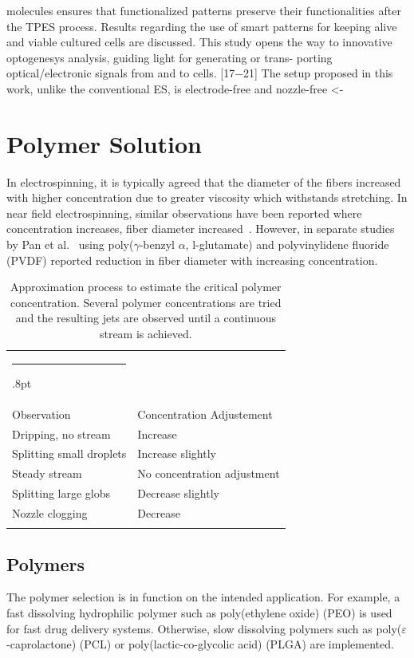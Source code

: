 \documentclass[5p,,preprint,12pt,twocolumn]{elsarticle}
\makeatletter
\def\hlinewd#1{%
  \noalign{\ifnum0=`}\fi\hrule \@height #1%
  \futurelet\reserved@a\@xhline}
\def\tbltoprule{\hlinewd{.8pt}\\[-12pt]}
\def\tblbottomrule{\noalign{\vspace*{6pt}}\hline\noalign{\vspace*{2pt}}}
\def\tblmidrule{\noalign{\vspace*{6pt}}\hline\noalign{\vspace*{2pt}}}
\makeatother
\begin{document}
molecules ensures that functionalized patterns preserve their functionalities after the TPES process. Results regarding the use of smart patterns for keeping alive and viable cultured cells are discussed. This study opens the way to innovative optogenesys analysis, guiding light for generating or trans- porting optical/electronic signals from and to cells. [17\ensuremath{-}21] The setup proposed in this work, unlike the conventional ES, is electrode-free and nozzle-free {\textless}-
    
\section{Polymer Solution}
In electrospinning, it is typically agreed that the diameter of the fibers increased with higher concentration due to greater viscosity which withstands stretching. In near field electrospinning, similar observations have been reported where concentration increases, fiber diameter increased\unskip~\cite{527120:11974306,527120:11974329}. However, in separate studies by Pan et al.\unskip~\cite{527120:11974317,527120:12321129} using poly(\ensuremath{\gamma }-benzyl \ensuremath{\alpha }, l-glutamate) and polyvinylidene fluoride (PVDF) reported reduction in fiber diameter with increasing concentration.
\begin{table}[!htbp]
\caption{{Approximation process to estimate the critical polymer concentration. Several polymer concentrations are tried and the resulting jets are observed until a continuous stream is achieved.} }
\label{tw-8687dd17082c}
\def\arraystretch{1}
\ignorespaces 
\centering 
\begin{tabulary}{\linewidth}{LL}
\tbltoprule Observation & Concentration Adjustement\\
\tblmidrule 
Dripping, no stream &
  Increase\\
Splitting small droplets &
  Increase slightly\\
Steady stream &
  No concentration adjustment\\
Splitting large globs &
  Decrease slightly\\
Nozzle clogging  &
  Decrease\\
\tblbottomrule 
\end{tabulary}\par 
\end{table}




\subsection{Polymers}The polymer selection is in function on the intended application. For example, a fast dissolving hydrophilic polymer such as poly(ethylene oxide) (PEO) is used for fast drug delivery systems. Otherwise, slow dissolving polymers such as poly($\varepsilon $-caprolactone) (PCL) or poly(lactic-co-glycolic acid) (PLGA) are implemented. \unskip~\cite{527120:13082763}
\end{document}
